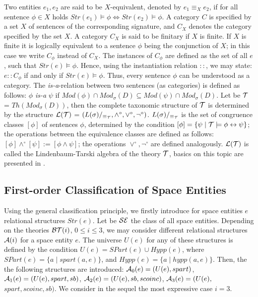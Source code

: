 \documentclass{ao2e}
\begin{document}
{Two entities $e_1, e_2$ are said to be $X$-equivalent, denoted by $e_1 \equiv_{X} e_2$,  if for all sentence $\phi \in X$ holds $Str(e_1) \models \phi \Leftrightarrow Str(e_2) \models \phi$. A category $C$ is specified by a set $X$ of sentences of the corresponding signature, and $C_X$ denotes the category specified by the set $X$. A category $C_X$ is said to be finitary if $X$ is finite. If $X$ is finite  it is logically equivalent to a sentence $\phi$ being the conjunction of $X$; in this case we write $C_{\phi}$ instead of $C_X$.
The instances of $C_{\phi}$ are defined as the set of all $e$, such that $Str(e) \models \phi$. Hence, using the instantiation relation $::$, we may state: $ e :: C_{\phi}$ if and only if $Str(e) \models \phi$. Thus, every sentence $\phi$ can be understood as a category.
The {\it is-a}-relation between two sentences (as categories) is defined as follows: $\phi$ {\it is-a} $\psi$ if
$Mod(\phi) \cap Mod_{\sigma} (D) \subseteq Mod(\psi) \cap Mod_{\sigma} (D)$. Let be ${\cal T}$ = $Th (Mod_{\sigma}(D))$,
then the complete taxonomic structure of ${\cal T}$ is determined by the structure  ${\cal L} ({\cal T})$ = $(L(\sigma)/_{\equiv_{\cal T}} , \wedge^{\circ} , \vee^{\circ} , \neg^{\circ} )$. $L(\sigma)/_{\equiv_{\cal T}}$ is the set of congruence
classes $[\phi]$ of sentences $\phi$, determined by the condition $[\phi] = \{ \psi \; | \; {\cal T} \models \phi \leftrightarrow \psi \}$; the operations between the equivalence classes are defined as follows:
$[\phi] \wedge^{\circ} [\psi] := [\phi \wedge \psi]$; the operations $\vee^{\circ}, \neg^{\circ}$ are defined analogously. ${\cal L}({\cal T})$ is called the Lindenbaum-Tarski algebra of the theory ${\cal T}$, basics on this topic are presented in \cite{hinman-p-2005-a}.


\subsection{First-order Classification of Space Entities}

Using the general classification principle, we firstly introduce for space entities $e$ relational structures
$Str(e)$. Let be ${\cal SE}$ the class of all space entities. Depending on the theories ${\cal BT}(i)$, 
$0 \le i \le 3$, we may consider different relational structures ${\cal A}(i)$ for a space entity $e$.
The universe $U(e)$ for any of these structures is defined by the condition 
$U(e) = SPart(e) \cup Hypp(e)$, where $SPart(e) = \{ a \; | \; spart(a,e) \}$, and
$Hypp(e) = \{ a \; | \; hypp(a,e)\}$. Then, the the following structures are introduced:
${\cal A}_0 (e) = (U(e), spart)$, ${\cal A}_1 (e) = (U(e), spart, sb)$, 
${\cal A}_2 (e) = (U(e), sb, scoinc)$, ${\cal A}_3 (e) = (U(e),$ $spart, scoinc, sb)$. We consider
in the sequel the most expressive case $i= 3$.

}
\end{document}
